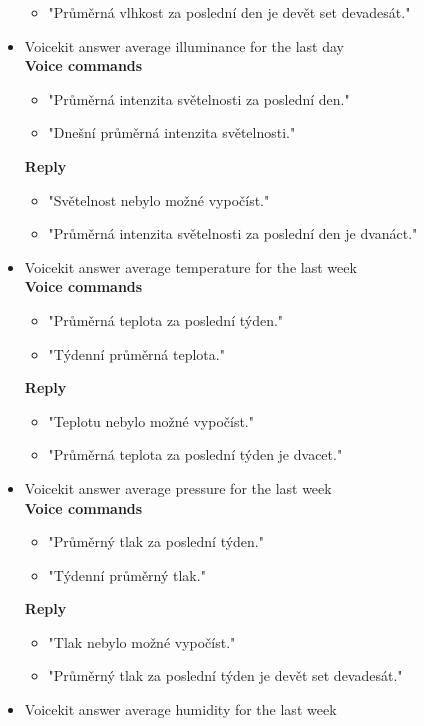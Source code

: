 \begin{itemize}
\begin{itemize}
        \item "Průměrná vlhkost za poslední den je devět set devadesát."
    \end{itemize}
    \item Voicekit answer average illuminance for the last day\\
    \textbf{Voice commands}
    \begin{itemize}
        \item "Průměrná intenzita světelnosti za poslední den."
        \item "Dnešní průměrná intenzita světelnosti."
    \end{itemize}
    \textbf{Reply}
    \begin{itemize}
        \item "Světelnost nebylo možné vypočíst."
        \item "Průměrná intenzita světelnosti za poslední den je dvanáct."
    \end{itemize}
    \item Voicekit answer average temperature for the last week\\
    \textbf{Voice commands}
    \begin{itemize}
        \item "Průměrná teplota za poslední týden."
        \item "Týdenní průměrná teplota."
    \end{itemize}
    \textbf{Reply}
    \begin{itemize}
        \item "Teplotu nebylo možné vypočíst."
        \item "Průměrná teplota za poslední týden je dvacet."
    \end{itemize}
    \item Voicekit answer average pressure for the last week\\
    \textbf{Voice commands}
    \begin{itemize}
        \item "Průměrný tlak za poslední týden."
        \item "Týdenní průměrný tlak."
    \end{itemize}
    \textbf{Reply}
    \begin{itemize}
        \item "Tlak nebylo možné vypočíst."
        \item "Průměrný tlak za poslední týden je devět set devadesát."
    \end{itemize}
    \item Voicekit answer average humidity for the last week\\

\end{itemize}
